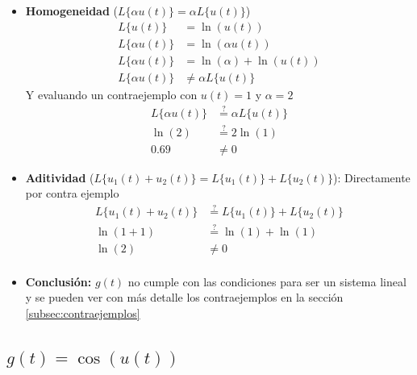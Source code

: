 \documentclass[12pt,a4paper]{article}
\begin{document}
\begin{itemize}
    \item \textbf{Homogeneidad} ($L\{\alpha u(t)\} = \alpha L\{u(t)\}$)
    \begin{align*}
        L\{u(t)\} &= \ln(u(t))\\
        L\{\alpha u(t)\} &= \ln(\alpha u(t))\\
        L\{\alpha u(t)\} &= \ln(\alpha) + \ln(u(t))\\
        L\{\alpha u(t)\} &\neq \alpha L\{u(t)\}
    \end{align*}
    Y evaluando un contraejemplo con $u(t) = 1$ y $\alpha = 2$
    \begin{align*}
        L\{\alpha u(t)\} &\stackrel{?}{=} \alpha L\{ u(t)\}\\
        \ln(2) &\stackrel{?}{=} 2 \ln(1)\\
        0.69 &\neq 0
    \end{align*}
    \item \textbf{Aditividad} ($L\{u_1(t)+u_2(t)\}=L\{u_1(t)\}+ L\{u_2(t)\}$): Directamente por contra ejemplo
    \begin{align*}
        L\{u_1(t)+u_2(t)\} &\stackrel{?}{=} L\{u_1(t)\}+ L\{u_2(t)\}\\
        \ln (1+1) &\stackrel{?}{=} \ln (1) + \ln (1) \\
        \ln (2) &\neq 0 \\
    \end{align*}
    \item \textbf{Conclusión:} $g(t)$ no cumple con las condiciones para ser un sistema lineal y se pueden ver con más detalle los contraejemplos en la sección \ref{subsec:contraejemplos}
\end{itemize}

\subsection{$g(t)=\cos(u(t))$}
\end{document}

